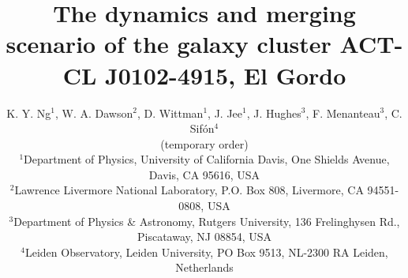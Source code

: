

\title[The dynamics and merging scenario of ACT-CL J0102-4915, El Gordo]{The dynamics and merging scenario of the galaxy cluster ACT-CL J0102-4915, El Gordo}
\author[K. Y. Ng et al.]{K. Y. Ng$^{1}$, W. A. Dawson$^{2}$, D. Wittman$^{1}$, J.
Jee$^{1}$, J. Hughes$^{3}$, F. Menanteau$^{3}$, C. Sif\'{o}n$^{4}$\\
(temporary order)\\
$^{1}$Department of Physics, University of California Davis, One Shields
Avenue, Davis, CA 95616, USA\\ 
$^{2}$Lawrence Livermore National Laboratory, P.O. Box 808, Livermore, CA 94551-0808, USA \\
$^3$Department of Physics \& Astronomy,
Rutgers University, 136 Frelinghysen Rd., Piscataway, NJ 08854, USA\\
$^{4}$Leiden Observatory, Leiden University, PO Box 9513, NL-2300 RA
Leiden, Netherlands\\}

